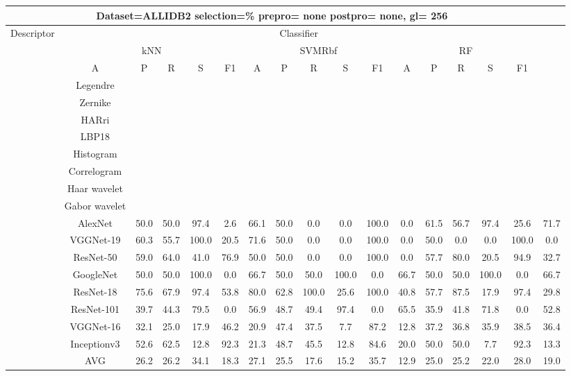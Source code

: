\documentclass[12pt,italian]{article}
\begin{document}
\begin{tiny}
 \pagebreak 
\begin{longtable}{lcccccccccccccccc}
\toprule
\multicolumn{16}{c}{Dataset=ALLIDB2 selection=\% prepro= none postpro= none, gl= 256} \\ 
\toprule
Descriptor & \multicolumn{15}{c}{Classifier} \\ 
& \multicolumn{5}{c}{kNN} & \multicolumn{5}{c}{SVMRbf} & \multicolumn{5}{c}{RF} \\ 
& A & P & R & S & F1 & A & P & R & S & F1 & A & P & R & S & F1 \\ 
\midrule
& Legendre \\ 
& Zernike \\ 
& HARri \\ 
& LBP18 \\ 
& Histogram \\ 
& Correlogram \\ 
& Haar wavelet \\ 
& Gabor wavelet \\ 
& AlexNet & 50.0 & 50.0 & 97.4 &  2.6 & 66.1 & 50.0 &  0.0 &  0.0 & 100.0 &  0.0 & 61.5 & 56.7 & 97.4 & 25.6 & 71.7 \\ 
& VGGNet-19 & 60.3 & 55.7 & 100.0 & 20.5 & 71.6 & 50.0 &  0.0 &  0.0 & 100.0 &  0.0 & 50.0 &  0.0 &  0.0 & 100.0 &  0.0 \\ 
& ResNet-50 & 59.0 & 64.0 & 41.0 & 76.9 & 50.0 & 50.0 &  0.0 &  0.0 & 100.0 &  0.0 & 57.7 & 80.0 & 20.5 & 94.9 & 32.7 \\ 
& GoogleNet & 50.0 & 50.0 & 100.0 &  0.0 & 66.7 & 50.0 & 50.0 & 100.0 &  0.0 & 66.7 & 50.0 & 50.0 & 100.0 &  0.0 & 66.7 \\ 
& ResNet-18 & 75.6 & 67.9 & 97.4 & 53.8 & 80.0 & 62.8 & 100.0 & 25.6 & 100.0 & 40.8 & 57.7 & 87.5 & 17.9 & 97.4 & 29.8 \\ 
& ResNet-101 & 39.7 & 44.3 & 79.5 &  0.0 & 56.9 & 48.7 & 49.4 & 97.4 &  0.0 & 65.5 & 35.9 & 41.8 & 71.8 &  0.0 & 52.8 \\ 
& VGGNet-16 & 32.1 & 25.0 & 17.9 & 46.2 & 20.9 & 47.4 & 37.5 &  7.7 & 87.2 & 12.8 & 37.2 & 36.8 & 35.9 & 38.5 & 36.4 \\ 
& Inceptionv3 & 52.6 & 62.5 & 12.8 & 92.3 & 21.3 & 48.7 & 45.5 & 12.8 & 84.6 & 20.0 & 50.0 & 50.0 &  7.7 & 92.3 & 13.3 \\ 
\hline
& AVG & 26.2 & 26.2 & 34.1 & 18.3 & 27.1 & 25.5 & 17.6 & 15.2 & 35.7 & 12.9 & 25.0 & 25.2 & 22.0 & 28.0 & 19.0 \\ 
\hline
\bottomrule
\end{longtable} 

 \pagebreak 
\end{tiny} 
 
\end{document}
